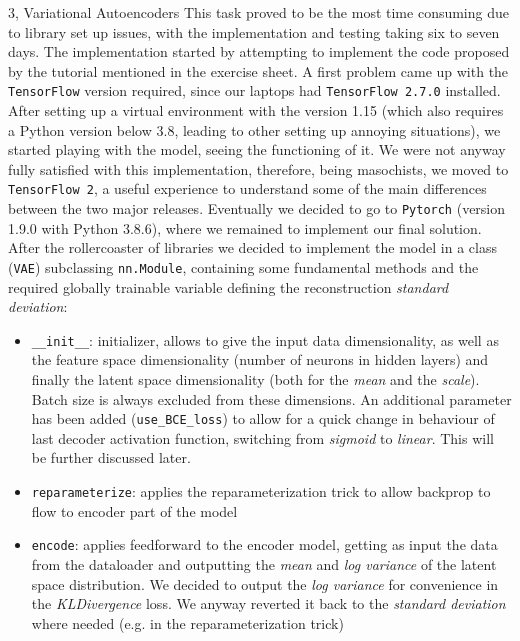 \documentclass[10pt,a4paper]{article}
\begin{document}
\begin{task}{3, Variational Autoencoders}
This task proved to be the most time consuming due to library set up issues, with the implementation and testing taking six to seven days. The implementation started by attempting to implement the code proposed by the tutorial mentioned in the exercise sheet. A first problem came up with the \texttt{TensorFlow} version required, since our laptops had \texttt{TensorFlow 2.7.0} installed. After setting up a virtual environment with the version 1.15 (which also requires a Python version below 3.8, leading to other setting up annoying situations), we started playing with the model, seeing the functioning of it. We were not anyway fully satisfied with this implementation, therefore, being masochists, we moved to \texttt{TensorFlow 2}, a useful experience to understand some of the main differences between the two major releases. Eventually we decided to go to \texttt{Pytorch} (version 1.9.0 with Python 3.8.6), where we remained to implement our final solution. \\After the rollercoaster of libraries we decided to implement the model in a class (\texttt{VAE}) subclassing \texttt{nn.Module}, containing some fundamental methods and the required globally trainable variable defining the reconstruction \textit{standard deviation}:
\begin{itemize}
    \item \texttt{\_\_init\_\_}: initializer, allows to give the input data dimensionality, as well as the feature space dimensionality (number of neurons in hidden layers) and finally the latent space dimensionality (both for the \textit{mean} and the \textit{scale}). Batch size is always excluded from these dimensions. An additional parameter has been added (\texttt{use\_BCE\_loss}) to allow for a quick change in behaviour of last decoder activation function, switching from \textit{sigmoid} to \textit{linear}. This will be further discussed later.
    \item \texttt{reparameterize}: applies the reparameterization trick to allow backprop to flow to encoder part of the model
    \item \texttt{encode}: applies feedforward to the encoder model, getting as input the data from the dataloader and outputting the \textit{mean} and \textit{log variance} of the latent space distribution. We decided to output the \textit{log variance} for convenience in the \textit{KLDivergence} loss. We anyway reverted it back to the \textit{standard deviation} where needed (e.g. in the reparameterization trick)

\end{itemize}
\end{task}
\end{document}
